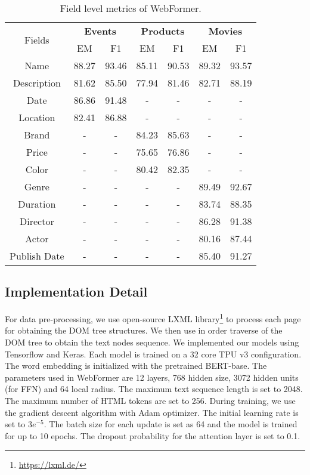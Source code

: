 \documentclass[sigconf]{acmart}
\begin{document}
\begin{table}
\begin{adjustbox}{width=0.88\columnwidth,center}
\begin{tabular}{c|cc|cc|cc}
\hline
\multirow{2}{*}{Fields} &	\multicolumn{2}{c|}{\bf Events} & \multicolumn{2}{c|}{\bf Products} & \multicolumn{2}{c}{\bf Movies} \\
\cline{2-7}
& EM & F1 &EM & F1 & EM & F1 \\
\hline
Name & 88.27 & 93.46 & 85.11 & 90.53 & 89.32 & 93.57  \\
Description & 81.62 & 85.50 & 77.94 & 81.46 & 82.71 & 88.19  \\
Date & 86.86 & 91.48 & - & - & - & -  \\
Location & 82.41 & 86.88 & - & - & - & -   \\
Brand & - & - & 84.23 & 85.63  & - & -  \\
Price  & - & - & 75.65 & 76.86  & - & -  \\
Color  & - & - & 80.42 & 82.35  & - & - \\
Genre  & - & -  & - & - & 89.49 & 92.67  \\
Duration  & - & -  & - & - & 83.74 & 88.35  \\
Director  & - & -  & - & - & 86.28 & 91.38  \\
Actor  & - & - & - & - & 80.16 & 87.44  \\
Publish Date & - & -  & - & - & 85.40 & 91.27  \\
\hline
\end{tabular}
\end{adjustbox}
\caption{Field level metrics of WebFormer.}\label{table:field_performance}
\end{table}

\subsection{Implementation Detail}
For data pre-processing, we use open-source LXML library\footnote{\url{https://lxml.de/}}
to process each page for obtaining the DOM tree structures. We then use in order traverse of the DOM tree to obtain the text nodes sequence.
We implemented our models using Tensorflow and Keras. Each model is trained on a 32 core TPU v3 configuration.
The word embedding is initialized with the pretrained BERT-base. The parameters used in WebFormer are 12 layers, 768 hidden size, 3072 hidden units (for FFN) and 64 local radius. The maximum text sequence length is set to 2048. The maximum number of HTML tokens are set to 256.
During training, we use the gradient descent algorithm with Adam optimizer. The initial learning rate is set to $3e^{-5}$. The batch size for each update is set as 64 and the model is trained for up to 10 epochs. The dropout probability for the attention layer is set to 0.1.
\end{document}
